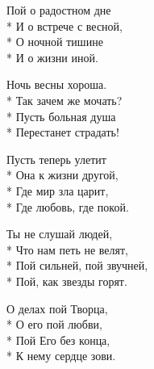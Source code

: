 \medskip

\begin{minipage}{\linewidth}
Пой о радостном дне\\*
И о встрече с весной,\\*
О ночной тишине\\*
И о жизни иной.\\
\end{minipage}\par\medskip\nobreak

\medskip

\begin{minipage}{\linewidth}
Ночь весны хороша.\\*
Так зачем же мочать?\\*
Пусть больная душа\\*
Перестанет страдать!\\
\end{minipage}\par\medskip\nobreak

\medskip

\begin{minipage}{\linewidth}
Пусть теперь улетит\\*
Она к жизни другой,\\*
Где мир зла царит,\\*
Где любовь, где покой.\\
\end{minipage}\par\medskip\nobreak

\medskip

\begin{minipage}{\linewidth}
Ты не слушай людей,\\*
Что нам петь не велят,\\*
Пой сильней, пой звучней,\\*
Пой, как звезды горят.\\
\end{minipage}\par\medskip\nobreak

\medskip

\begin{minipage}{\linewidth}
О делах пой Творца,\\*
О его пой любви,\\*
Пой Его без конца,\\*
К нему сердце зови.\\
\end{minipage}\par\medskip\nobreak

